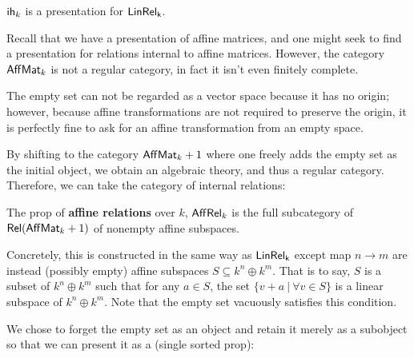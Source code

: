 




\begin{lemma}
${\sf ih}_k$ is a presentation for $\sf LinRel_{k}$.
\end{lemma}



Recall that we have a presentation of affine matrices, and one might seek to find a presentation for relations internal to affine matrices.
However, the category $\mathsf{Aff}\mathsf{Mat}_k$ is not a regular category, in fact it isn't even finitely complete. 

The empty set can not be regarded as a vector space because it has no origin; however, because affine transformations are not required to preserve the origin, it is perfectly fine to ask for an affine transformation from an empty space.


By shifting to the category $\mathsf{Aff}\mathsf{Mat}_k+1$ where one freely adds the empty set as the initial object,  we obtain an algebraic theory, and thus a regular category.  Therefore, we can take the category of internal relations:






\begin{definition}
The prop of {\bf affine relations} over $k$, $\mathsf{Aff}\mathsf{Rel}_{k}$ is the full subcategory of  $\mathsf{Rel}(\mathsf{Aff}\mathsf{Mat}_k+1)$ of nonempty affine subspaces.
\end{definition}

Concretely, this is constructed in the same way as $\sf LinRel_k$ except map $n\to m$ are instead (possibly empty) affine subspaces $S \subseteq k^n\oplus k^m$. That is to say, $S$ is a subset of $k^n\oplus k^m$ such that for any $a \in S$, the set $\{v+a\ |\ \forall v \in S\}$ is a linear subspace of  $k^n\oplus k^m$.  Note that the empty set vacuously satisfies this condition.


We chose to forget the empty set as an object and retain it merely as a subobject so that we can present it as a (single sorted prop):

